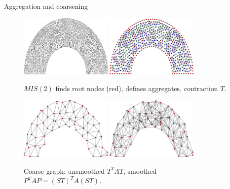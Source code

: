 \documentclass{beamer}
\begin{document}
\begin{frame}{Aggregation and coarsening}
  \begin{figure}
    \centering
    \includegraphics[width=0.4\textwidth]{figures/MG/LubyAgg1} \qquad \qquad
    \includegraphics[width=0.4\textwidth]{figures/MG/LubyAgg2} 
    \caption{$MIS(2)$ finds root nodes (red), defines aggregates, contraction $T$.}
  \end{figure}

  \begin{figure}
    \centering
    \includegraphics[width=0.4\textwidth]{figures/MG/CoarseUnsmoothedRoot} \qquad \qquad
    \includegraphics[width=0.4\textwidth]{figures/MG/CoarseSmoothedRoot}
    \caption{Coarse graph: unsmoothed $T^T A T$, smoothed $P^T A P = (ST)^T A (ST)$.}
  \end{figure}
\end{frame}
\end{document}
